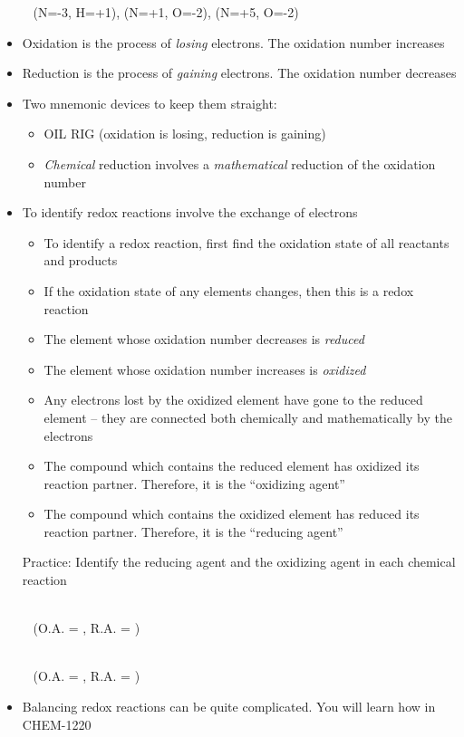 \documentclass[12pt, openany, letterpaper]{memoir}
\begin{document}
\begin{itemize}
	      ~\hphantom{Practice:} (N=-3, H=+1), (N=+1, O=-2), (N=+5, O=-2)
	\item Oxidation is the process of \emph{losing} electrons. The oxidation number increases
	\item Reduction is the process of \emph{gaining} electrons. The oxidation number decreases
	\item Two mnemonic devices to keep them straight:
	      \begin{itemize}
		      \item OIL RIG (oxidation is losing, reduction is gaining)
		      \item \emph{Chemical} reduction involves a \emph{mathematical} reduction of the oxidation number
	      \end{itemize}
	\item To identify redox reactions involve the exchange of electrons
	      \begin{itemize}
		      \item To identify a redox reaction, first find the oxidation state of all reactants and products
		      \item If the oxidation state of any elements changes, then this is a redox reaction
		      \item The element whose oxidation number decreases is \emph{reduced}
		      \item The element whose oxidation number increases is \emph{oxidized}
		      \item Any electrons lost by the oxidized element have gone to the reduced element -- they are connected both chemically and mathematically by the electrons
		      \item The compound which contains the reduced element has oxidized its reaction partner. Therefore, it is the ``oxidizing agent''
		      \item The compound which contains the oxidized element has reduced its reaction partner. Therefore, it is the ``reducing agent''
	      \end{itemize}

	      Practice: Identify the reducing agent and the oxidizing agent in each chemical reaction

	      ~\hphantom{Practice:} \\
	      ~\hphantom{Practice: } (O.A. = , R.A. = )

	      ~\hphantom{Practice:} \\
	      ~\hphantom{Practice: } (O.A. = , R.A. = )
	\item Balancing redox reactions can be quite complicated. You will learn how in CHEM-1220
\end{itemize}
\end{document}
